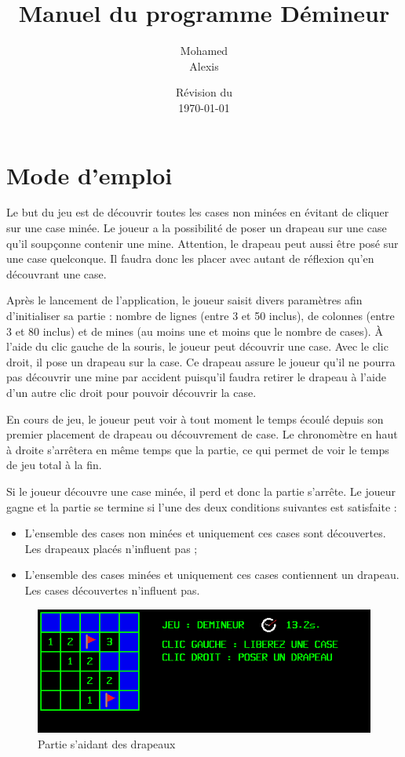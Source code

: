 \documentclass[a4paper, 12pt, oneside]{article}
\title{Manuel du programme Démineur}
\author{Mohamed \bsc{Lakhal}\\Alexis \bsc{Cabodi}}
\date{Révision du\\\today}
\begin{document}
\maketitle
\newpage
\tableofcontents
\newpage

\section{Mode d'emploi}
Le but du jeu est de découvrir toutes les cases non minées en évitant de cliquer sur une case minée. Le joueur a la possibilité de poser un drapeau sur une case qu'il soupçonne contenir une mine. Attention, le drapeau peut aussi être posé sur une case quelconque. Il faudra donc les placer avec autant de réflexion qu'en découvrant une case.
\bigskip

Après le lancement de l'application, le joueur saisit divers paramètres afin d'initialiser sa partie : nombre de lignes (entre 3 et 50 inclus), de colonnes (entre 3 et 80 inclus) et de mines (au moins une et moins que le nombre de cases).
À l'aide du clic gauche de la souris, le joueur peut découvrir une case. Avec le clic droit, il pose un drapeau sur la case. Ce drapeau assure le joueur qu'il ne pourra pas découvrir une mine par accident puisqu'il faudra retirer le drapeau à l'aide d'un autre clic droit pour pouvoir découvrir la case.
\bigskip

En cours de jeu, le joueur peut voir à tout moment le temps écoulé depuis son premier placement de drapeau ou découvrement de case. Le chronomètre en haut à droite s'arrêtera en même temps que la partie, ce qui permet de voir le temps de jeu total à la fin.
\bigskip

Si le joueur découvre une case minée, il perd et donc la partie s'arrête.
Le joueur gagne et la partie se termine si l'une des deux conditions suivantes est satisfaite :
\begin{itemize}
	\item L'ensemble des cases non minées et uniquement ces cases sont découvertes. Les drapeaux placés n'influent pas ;
	\item L'ensemble des cases minées et uniquement ces cases contiennent un drapeau. Les cases découvertes n'influent pas.
\end{itemize}
\smallskip

\begin{figure}[htp]
\includegraphics[width=\columnwidth]{Exemple.png}
\caption{Partie s'aidant des drapeaux}
\label{fig:picApercu}
\end{figure}
\end{document}

